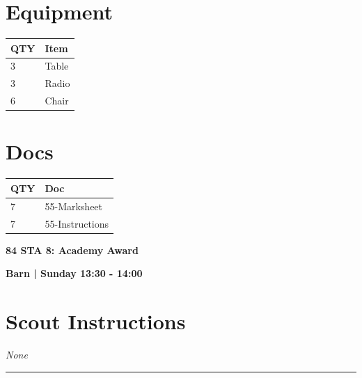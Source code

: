 \documentclass[10pt]{article}
\newcommand{\newtitle}[1]{\begin{center}{\Huge\bfseries #1 }\\ \vspace{5mm}\end{center}}
\newcommand{\newsubtitle}[1]{\begin{center}{\color{grey}\Large\bfseries #1 }\\ \vspace{5mm}\end{center}}
\begin{document}
	\begin{multicols}{2}

		\section*{\faWrench \: Equipment}

		
	\begin{center}
			\begin{tabular}{p{2cm}p{4cm}}


				\textbf{QTY} & \textbf{Item} \\\toprule
												3&Table\\\midrule
												3&Radio\\\midrule
												6&Chair\\\midrule
								\end{tabular}

			\end{center}

		
		\vfill\null
		\columnbreak

			\section*{\faFile \: Docs}
		 	\begin{center}
			\begin{tabular}{p{2cm}p{4cm}}

			\textbf{QTY} & \textbf{Doc} \\\toprule
										7&55-Marksheet\\\midrule
										7&55-Instructions\\\midrule
							\end{tabular}
			\end{center}
	

		\vfill\null

		\end{multicols}



	\vspace{1cm}


	\clearpage
		\newtitle{84 STA 8: Academy Award }
	\newsubtitle{Barn | Sunday 13:30 - 14:00}
		\setcounter{section}{83}
	\section*{Scout Instructions}
		\textit{None}
	
	\vspace{0.5cm}
	\hrule
	\vspace{0.5cm}
\end{document}
